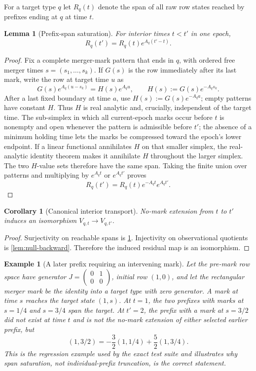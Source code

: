 \documentclass[11pt]{article}
\newtheorem{lemma}[theorem]{Lemma}
\newtheorem{corollary}[theorem]{Corollary}
\newtheorem{example}[theorem]{Example}
\begin{document}
For a target type $q$ let $R_q(t)$ denote the span of all raw row states reached by prefixes ending at $q$ at time $t$.

\begin{lemma}[Prefix-span saturation]
\label{lem:prefix-span-supp}
For interior times $t<t'$ in one epoch,
\[
R_q(t')=R_q(t)e^{A_q(t'-t)}.
\]
\end{lemma}

\begin{proof}
Fix a complete merger-mark pattern that ends in $q$, with ordered free merger times $s=(s_1,\ldots,s_k)$.  If $G(s)$ is the row immediately after its last mark, write the row at target time $u$ as
\[
G(s)e^{A_q(u-s_k)}=H(s)e^{A_qu},
\qquad H(s):=G(s)e^{-A_qs_k}.
\]
After a last fixed boundary at time $a$, use $H(s):=G(s)e^{-A_qa}$; empty patterns have constant $H$.  Thus $H$ is real analytic and, crucially, independent of the target time.  The sub-simplex in which all current-epoch marks occur before $t$ is nonempty and open whenever the pattern is admissible before $t'$; the absence of a minimum holding time lets the marks be compressed toward the epoch's lower endpoint.  If a linear functional annihilates $H$ on that smaller simplex, the real-analytic identity theorem makes it annihilate $H$ throughout the larger simplex.  The two $H$-value sets therefore have the same span.  Taking the finite union over patterns and multiplying by $e^{A_qt}$ or $e^{A_qt'}$ proves
\[
R_q(t')=R_q(t)e^{-A_qt}e^{A_qt'}.
\]
\end{proof}

\begin{corollary}[Canonical interior transport]
No-mark extension from $t$ to $t'$ induces an isomorphism $V_{q,t}\to V_{q,t'}$.
\end{corollary}

\begin{proof}
Surjectivity on reachable spans is \cref{lem:prefix-span-supp}.  Injectivity on observational quotients is \cref{lem:null-backward}.  Therefore the induced residual map is an isomorphism.
\end{proof}

\begin{example}[A later prefix requiring an intervening mark]
Let the pre-mark row space have generator $J=\left(\begin{smallmatrix}0&1\\0&0\end{smallmatrix}\right)$, initial row $(1,0)$, and let the rectangular merger mark be the identity into a target type with zero generator.  A mark at time $s$ reaches the target state $(1,s)$.  At $t=1$, the two prefixes with marks at $s=1/4$ and $s=3/4$ span the target.  At $t'=2$, the prefix with a mark at $s=3/2$ did not exist at time $t$ and is not the no-mark extension of either selected earlier prefix, but
\[
(1,3/2)=-\frac32(1,1/4)+\frac52(1,3/4).
\]
This is the regression example used by the exact test suite and illustrates why span saturation, not individual-prefix truncation, is the correct statement.
\end{example}
\end{document}
